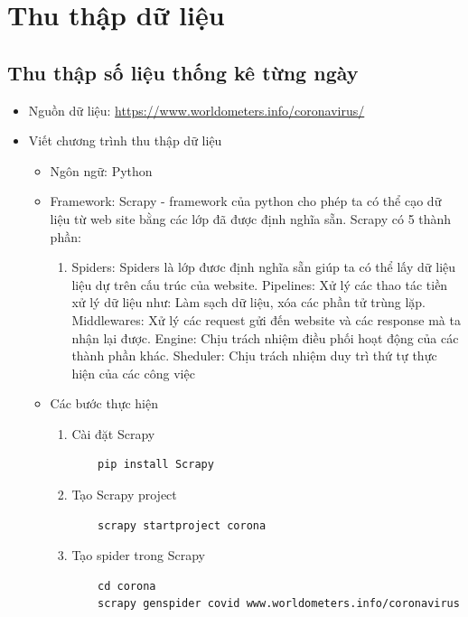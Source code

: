 \documentclass[a4paper, 12pt]{article}
\begin{document}
    \section{Thu thập dữ liệu}

    \subsection{Thu thập số liệu thống kê từng ngày}

    \begin{itemize}
        \item Nguồn dữ liệu: \url{https://www.worldometers.info/coronavirus/}
        \item Viết chương trình thu thập dữ liệu
        \begin{itemize}
            \item Ngôn ngữ: Python
            \item Framework: Scrapy - framework của python cho phép ta có thể cạo dữ liệu từ web site bằng các lớp đã được định nghĩa sẵn. Scrapy có 5 thành phần:
            \begin{enumerate}
                \item Spiders: Spiders là lớp đươc định nghĩa sẵn giúp ta có thể lấy dữ liệu liệu dự trên cấu trúc của website.
                Pipelines: Xử lý các thao tác tiền xử lý dữ liệu như: Làm sạch dữ liệu, xóa các phần tử trùng lặp.
                Middlewares: Xử lý các request gửi đến website và các response mà ta nhận lại được.
                Engine: Chịu trách nhiệm điều phối hoạt động của các thành phần khác.
                Sheduler: Chịu trách nhiệm duy trì thứ tự thực hiện của các công việc
            \end{enumerate}

            \item Các bước thực hiện
            \begin{enumerate}
                \item Cài đặt Scrapy
                \begin{verbatim}
    pip install Scrapy
                \end{verbatim}

                \item Tạo Scrapy project
                \begin{verbatim}
    scrapy startproject corona
                \end{verbatim}

                \item Tạo spider trong Scrapy
                \begin{verbatim}
    cd corona
    scrapy genspider covid www.worldometers.info/coronavirus
                \end{verbatim}


\end{enumerate}
\end{itemize}
\end{itemize}
\end{document}
